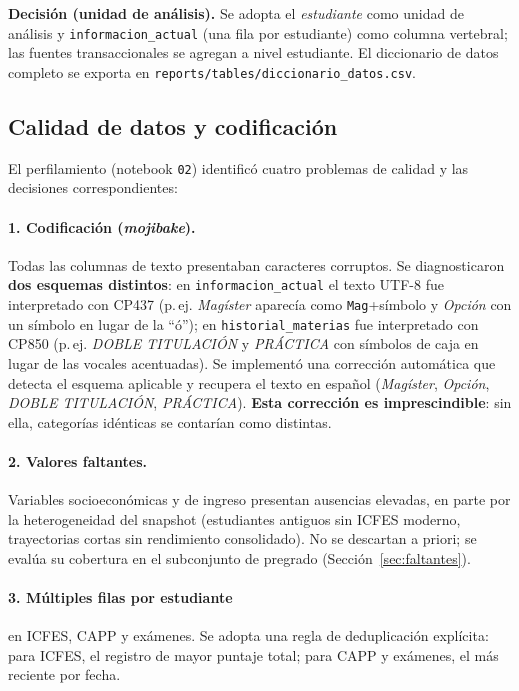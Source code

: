 \documentclass[12pt,a4paper]{article}
\begin{document}
\textbf{Decisión (unidad de análisis).} Se adopta el \emph{estudiante} como unidad
de análisis y \texttt{informacion\_actual} (una fila por estudiante) como columna
vertebral; las fuentes transaccionales se agregan a nivel estudiante. El
diccionario de datos completo se exporta en
\texttt{reports/tables/diccionario\_datos.csv}.

\subsection{Calidad de datos y codificación}
\label{sec:calidad}
El perfilamiento (notebook \texttt{02}) identificó cuatro problemas de calidad y
las decisiones correspondientes:

\paragraph{1. Codificación (\emph{mojibake}).} Todas las columnas de texto
presentaban caracteres corruptos. Se diagnosticaron \textbf{dos esquemas
distintos}: en \texttt{informacion\_actual} el texto UTF-8 fue interpretado con
CP437 (p.\,ej. \emph{Magíster} aparecía como \texttt{Mag}+símbolo y \emph{Opción}
con un símbolo en lugar de la ``ó''); en \texttt{historial\_materias} fue
interpretado con CP850 (p.\,ej. \emph{DOBLE TITULACIÓN} y \emph{PRÁCTICA} con
símbolos de caja en lugar de las vocales acentuadas). Se implementó una corrección
automática que detecta el esquema aplicable y recupera el texto en español
(\emph{Magíster}, \emph{Opción}, \emph{DOBLE TITULACIÓN}, \emph{PRÁCTICA}).
\textbf{Esta corrección es imprescindible}: sin ella, categorías idénticas se
contarían como distintas.

\paragraph{2. Valores faltantes.} Variables socioeconómicas y de ingreso
presentan ausencias elevadas, en parte por la heterogeneidad del snapshot
(estudiantes antiguos sin ICFES moderno, trayectorias cortas sin rendimiento
consolidado). No se descartan a priori; se evalúa su cobertura en el subconjunto
de pregrado (Sección~\ref{sec:faltantes}).

\paragraph{3. Múltiples filas por estudiante} en ICFES, CAPP y exámenes. Se adopta
una regla de deduplicación explícita: para ICFES, el registro de mayor puntaje
total; para CAPP y exámenes, el más reciente por fecha.
\end{document}

